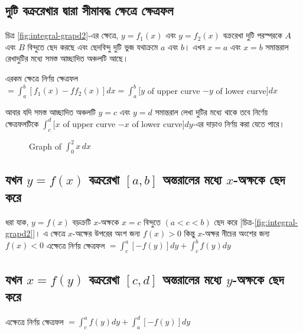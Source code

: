 \subsection{দুটি বক্ররেখার দ্বারা সীমাবদ্ধ ক্ষেত্রে ক্ষেত্রফল}
    চিত্র \ref{fig:integral-grapd2}-এর ক্ষেত্রে, $y = f_1(x)$ এবং $y = f_2(x)$ 
    বক্ররেখা দুটি পরস্পরকে $A$ এবং $B$ বিন্দুতে ছেদ করছে এবং ছেদবিন্দু দুটি ভুজ যথাক্রমে $a$ এবং $b$।
    এখন $x = a$ এবং $x = b$ সমান্তরাল রেখাদুটির মধ্যে সমস্ত আচ্ছাদিত অঞ্চলটি আছে।

    এরকম ক্ষেত্রে নির্ণয় ক্ষেত্রফল\\ $= \int_{a}^{b}[f_1(x) -f f_2(x)]dx = \int_{a}^{b}[y$ of upper curve $- y$ of lower curve$]dx$

    আবার যদি সমস্ত আচ্ছাদিত অঞ্চলটি $y = c$ এবং $y = d$ সমান্তরাল লেখা দুটির মধ্যে থাকে তবে নির্ণেয় ক্ষেত্রফলটিকে
    $\int_{c}^{d}[x$ of upper curve $- x$ of lower curve$]dy$-এর দাড়াও নির্ণয় করা যেতে পারে।

    \begin{figure}[h]
    \centering
    \caption{Graph of $\int_{0}^{2} x \, dx$}
    \label{fig:integralsdfssd-graph}
    \end{figure}

\newpage
\subsection{যখন $y = f(x)$ বক্ররেখা $[a,b]$ অন্তরালের মধ্যে $x$-অক্ষকে ছেদ করে}

    ধরা যাক, $y = f(x)$ বড়ক্রটি $x$-অক্ষকে $x = c$ বিন্দুতে $(a < c < b)$ ছেদ করে [চিত্র-\ref{fig:integral-grapd2}]।
    এ ক্ষেত্রে $x$-অক্ষের উপরের অংশ জন্য $f(x) > 0$ কিন্তু $x$-অক্ষর নীচের অংশের জন্য $f(x) < 0$
    এক্ষেত্রে নির্ণয় ক্ষেত্রফল $= \int_{c}^{a}[-f(y)]dy + \int_{c}^{b}f(y)dy$

\subsection{যখন $x = f(y)$ বক্ররেখা $[c,d]$ অন্তরালের মধ্যে $y$-অক্ষকে ছেদ করে}

   
    এক্ষেত্রে নির্ণয় ক্ষেত্রফল $= \int_{c}^{a}f(y)dy + \int_{a}^{d}[-f(y)]dy$


\newpage


